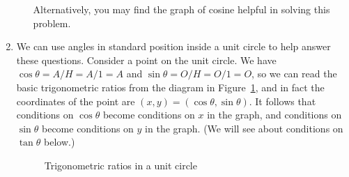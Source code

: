 \documentclass{article}
\begin{document}
\begin{enumerate}
\begin{enumerate}
    Alternatively, you may find the graph of cosine helpful in solving
    this problem. %
  \end{enumerate}
\item %
  We can use angles in standard position inside a unit circle to help
  answer these questions.  Consider a point on the unit circle.
  We have $\cos\theta = A/H =
  A/1 = A$ and $\sin\theta = O/H = O/1 = O$, so we can read the basic
  trigonometric ratios from the diagram in Figure~\ref{fig:trig}, and
  in fact the coordinates of the point are $(x,y)=(\cos\theta, \sin\theta)$.
  It follows that conditions on $\cos\theta$ become conditions on $x$ in
  the graph, and conditions on $\sin\theta$ become conditions on $y$ in
  the graph.  (We will see about conditions on $\tan\theta$ below.)
  \begin{figure}[htbp]
    \centering
    \caption{Trigonometric ratios in a unit circle}
    \label{fig:trig}
  \end{figure}


\end{enumerate}
\end{document}
